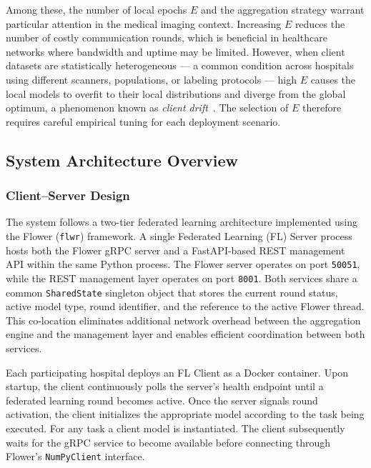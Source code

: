 Among these, the number of local epochs $E$ and the aggregation strategy
warrant particular attention in the medical imaging context. Increasing $E$
reduces the number of costly communication rounds, which is beneficial in
healthcare networks where bandwidth and uptime may be limited. However,
when client datasets are statistically heterogeneous — a common condition
across hospitals using different scanners, populations, or labeling protocols
— high $E$ causes the local models to overfit to their local distributions
and diverge from the global optimum, a phenomenon known as \textit{client
drift}~\cite{li2020}. The selection of $E$ therefore requires careful
empirical tuning for each deployment scenario.
 
\subsection{System Architecture Overview}
\subsubsection{Client--Server Design}

The system follows a two-tier federated learning architecture implemented using the Flower (\texttt{flwr}) framework. A single Federated Learning (FL) Server process hosts both the Flower gRPC server and a FastAPI-based REST management API within the same Python process. The Flower server operates on port \texttt{50051}, while the REST management layer operates on port \texttt{8001}. Both services share a common \texttt{SharedState} singleton object that stores the current round status, active model type, round identifier, and the reference to the active Flower thread. This co-location eliminates additional network overhead between the aggregation engine and the management layer and enables efficient coordination between both services.

Each participating hospital deploys an FL Client as a Docker container. Upon startup, the client continuously polls the server's health endpoint until a federated learning round becomes active. Once the server signals round activation, the client initializes the appropriate model according to the task being executed. For any task a client model is instantiated. The client subsequently waits for the gRPC service to become available before connecting through Flower's \texttt{NumPyClient} interface.

